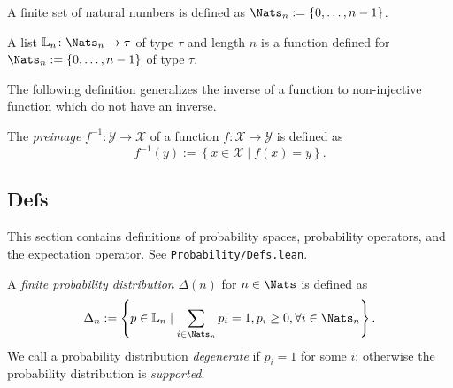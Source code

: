 \begin{definition}
A finite set of natural numbers is defined as $\Nats_n := \left\{ 0, \dots , n-1   \right\}$.
\end{definition}

\begin{definition}
A list $\mathbb{L}_n \colon \Nats_n \to \tau$ of type $\tau$ and length $n$ is a function defined for $\Nats_{n} := \left\{ 0, \dots , n-1 \right\}$ of type $\tau$.
\end{definition}

The following definition generalizes the inverse of a function to non-injective function which do not have an inverse. 
\begin{definition}[Preimage]
The \emph{preimage} $f^{-1}\colon \mathcal{Y} \to \mathcal{X}$ of a function $f\colon \mathcal{X} \to \mathcal{Y}$ is defined as
\begin{equation} \label{eq:preimage-set}
f^{-1}(y) := \left\{ x \in \mathcal{X} \mid  f(x) = y \right\} .
\end{equation}
\end{definition}

\subsection{Defs}

This section contains definitions of probability spaces, probability operators, and the expectation operator. See \texttt{Probability/Defs.lean}.
\begin{definition}
A \emph{finite probability distribution} $\Delta(n)$ for $n\in \Nats$ is defined as
\[
\Delta_n := \left\{ p \in \mathbb{L}_n \mid  \sum_{i \in \Nats_n} p_i = 1, p_i \ge 0, \forall i \in \Nats_n \right\}.
\]
We call a probability distribution \emph{degenerate} if $p_i = 1$ for some $i$; otherwise the probability distribution is \emph{supported}.
\end{definition}


